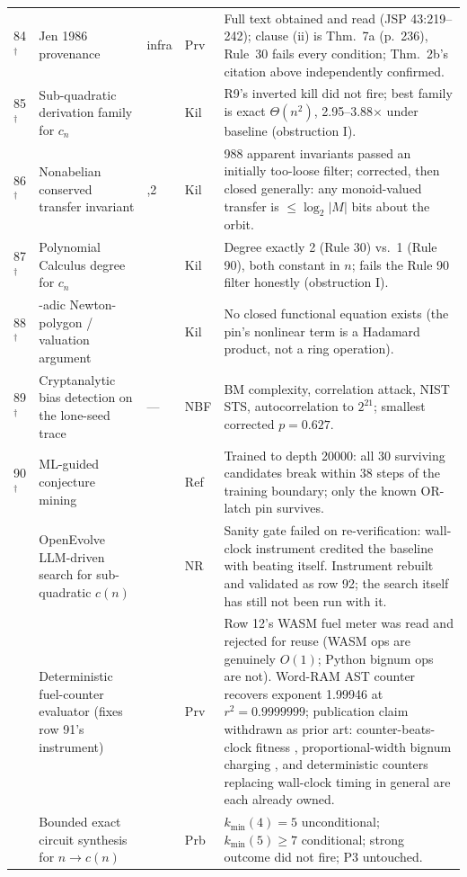 \documentclass[11pt]{article}
\theoremstyle{definition}
\begin{document}
{\begin{longtable}{@{}>{\raggedleft\arraybackslash}p{0.62cm} >{\raggedright\arraybackslash}p{5.4cm} >{\centering\arraybackslash}p{1.0cm} >{\centering\arraybackslash}p{0.7cm} >{\raggedright\arraybackslash}p{8.15cm}@{}}
\mbox{84$^\dagger$} & Jen 1986 provenance & infra & Prv & Full text obtained and read (JSP 43:219--242); clause (ii) is Thm.~7a (p.~236), Rule~30 fails every condition; Thm.~2b's citation above independently confirmed. \\
\mbox{85$^\dagger$} & Sub-quadratic derivation family for $c_n$ & 3 & Kil & R9's inverted kill did not fire; best family is exact $\Theta(n^2)$, 2.95--3.88$\times$ under baseline (obstruction I). \\
\mbox{86$^\dagger$} & Nonabelian conserved transfer invariant & 1,2 & Kil & 1{,}988 apparent invariants passed an initially too-loose filter; corrected, then closed generally: any monoid-valued transfer is $\le\log_2|M|$ bits about the orbit. \\
\mbox{87$^\dagger$} & Polynomial Calculus degree for $c_n$ & 3 & Kil & Degree exactly 2 (Rule 30) vs.\ 1 (Rule 90), both constant in $n$; fails the Rule 90 filter honestly (obstruction I). \\
\mbox{88$^\dagger$} & 2-adic Newton-polygon / valuation argument & 1 & Kil & No closed functional equation exists (the pin's nonlinear term is a Hadamard product, not a ring operation). \\
\mbox{89$^\dagger$} & Cryptanalytic bias detection on the lone-seed trace & --- & NBF & BM complexity, correlation attack, NIST STS, autocorrelation to $2^{21}$; smallest corrected $p=0.627$. \\
\mbox{90$^\dagger$} & ML-guided conjecture mining & 1 & Ref & Trained to depth 20000: all 30 surviving candidates break within 38 steps of the training boundary; only the known OR-latch pin survives. \\
91 & OpenEvolve LLM-driven search for sub-quadratic $c(n)$ & 3 & NR & Sanity gate failed on re-verification: wall-clock instrument credited the baseline with beating itself. Instrument rebuilt and validated as row 92; the search itself has still not been run with it. \\
92 & Deterministic fuel-counter evaluator (fixes row 91's instrument) & 3 & Prv & Row 12's WASM fuel meter was read and rejected for reuse (WASM ops are genuinely $O(1)$; Python bignum ops are not). Word-RAM AST counter recovers exponent 1.99946 at $r^2=0.9999999$; publication claim withdrawn as prior art: counter-beats-clock fitness \cite{bouras2026fitness}, proportional-width bignum charging \cite{eip2565}, and deterministic counters replacing wall-clock timing in general \cite{nethercote2007valgrind} are each already owned. \\
93 & Bounded exact circuit synthesis for $n\to c(n)$ & 3 & Prb & $k_{\min}(4)=5$ unconditional; $k_{\min}(5)\ge7$ conditional; strong outcome did not fire; P3 untouched. \\
\end{longtable}
}
\end{document}
